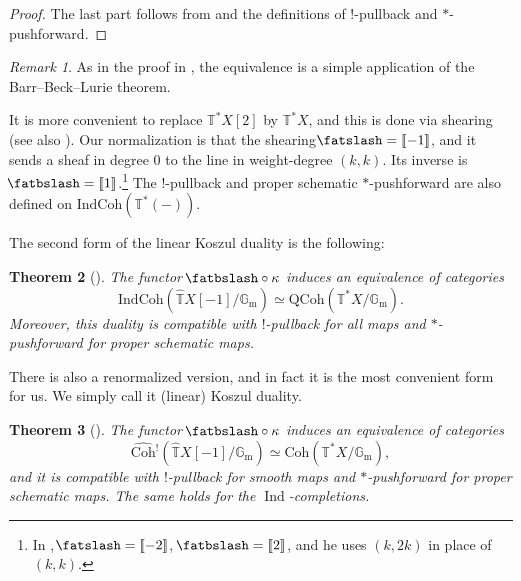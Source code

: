 \documentclass{amsart}
\newtheorem{theorem}{Theorem}[subsection]
\theoremstyle{definition}
\theoremstyle{remark}
\newtheorem{remark}[theorem]{Remark}
\numberwithin{equation}{section}
\DeclareMathOperator{\Ind}{Ind}
\newcommand{\Gm}{{\mathbb{G}_{\mathrm{m}}}}
\newcommand{\wh}{\widehat}
\newcommand{\IndCoh}{\mathrm{IndCoh}}
\newcommand{\QCoh}{\mathrm{QCoh}}
\newcommand{\Coh}{\mathrm{Coh}}
\newcommand{\T}{\mathbb{T}}
\newcommand{\shear}{{\mathbin{\mkern-6mu\fatslash}}}
\newcommand{\unshear}{\,{\mathbin{\mkern-6mu\fatbslash}}}
\begin{document}
\begin{proof}
The last part follows from \cite[Theorem 2.1.33]{Chen2023categorical} and the definitions of $!$-pullback and $*$-pushforward.
\end{proof}

\begin{remark}
As in the proof in \cite{Chen2023categorical}, the equivalence is a simple application of the Barr--Beck--Lurie theorem. 
\end{remark}

It is more convenient to replace $\T^\ast X [2]$ by $\T^\ast X$, and this is done via shearing \cite{Chen2023categorical} (see also \cite[\S 6]{BZSV}). Our normalization is that the shearing $\shear=[\![-1]\!]$, and it sends a sheaf in degree 0 to the line in weight-degree $(k,k)$. Its inverse is $\unshear=[\![1]\!]$.\footnote{In \cite[Definition 2.1.7]{Chen2023categorical}, $\shear=[\![-2]\!]$, $\unshear=[\![ 2]\!]$, and he uses $(k, 2k)$ in place of $(k,k)$.}
The $!$-pullback and proper schematic $*$-pushforward are also defined on $\IndCoh(\T^\ast (-))$. 

The second form of the linear Koszul duality is the following:

\begin{theorem}[{\cite[Theorems 2.1.19, 2.3.6]{Chen2023categorical}}]{\label{thm: koszulduality}}
The functor $ \unshear \circ \kappa$ induces an equivalence of categories
\begin{equation*}
\IndCoh(\wh{\T}X[-1] / \Gm) \simeq  \QCoh(\T^{\ast}X / \Gm). 
\end{equation*}
Moreover, this duality is compatible with $!$-pullback for all maps and $*$-pushforward for proper schematic maps. 
\end{theorem}

There is also a renormalized version, and in fact it is the most convenient form for us. We simply call it (linear) Koszul duality. 

\begin{theorem}[{\cite[Theorems 2.2.10, 2.3.6]{Chen2023categorical}}]{\label{thm: renormalizedcontinuousKoszul}}
The functor $\unshear \circ \kappa$ induces an equivalence of categories
\begin{equation*}
\wh{\Coh}{}^!(\wh{\T}X[-1] / \Gm) \simeq  \Coh(\T^{\ast}X / \Gm),
\end{equation*}
and it is compatible with $!$-pullback for smooth maps and $*$-pushforward for proper schematic maps. The same holds for the $\Ind$-completions. 
\end{theorem}
\end{document}
